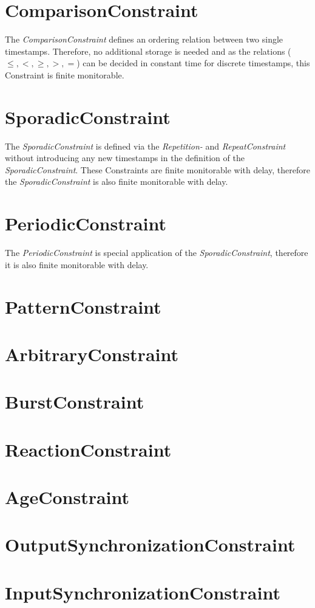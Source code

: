 \section{ComparisonConstraint}
	The \emph{ComparisonConstraint} defines an ordering relation between two single timestamps. Therefore, no additional storage is needed and as the relations ($\leq, <, \geq, >, =$) can be decided in constant time for discrete timestamps, this Constraint is finite monitorable.
	
\section{SporadicConstraint}
	The \emph{SporadicConstraint} is defined via the \emph{Repetition-} and \emph{RepeatConstraint} without introducing any new timestamps in the definition of the \emph{SporadicConstraint}. These Constraints are finite monitorable with delay, therefore the \emph{SporadicConstraint} is also finite monitorable with delay.
	
\section{PeriodicConstraint}
	The \emph{PeriodicConstraint} is special application of the \emph{SporadicConstraint}, therefore it is also finite monitorable with delay.
	
\section{PatternConstraint}
\section{ArbitraryConstraint}
\section{BurstConstraint}
\section{ReactionConstraint}
\section{AgeConstraint}
\section{OutputSynchronizationConstraint}
\section{InputSynchronizationConstraint}